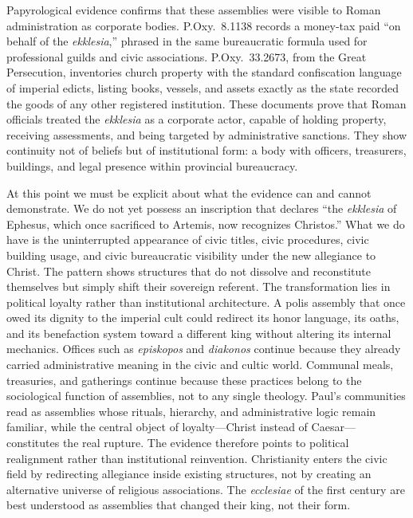 Papyrological evidence confirms that these assemblies were visible to Roman administration as corporate bodies.
P.Oxy.~8.1138 records a money-tax paid ``on behalf of the \textit{ekklesia},'' phrased in the same bureaucratic formula used for professional guilds and civic associations.
P.Oxy.~33.2673, from the Great Persecution, inventories church property with the standard confiscation language of imperial edicts, listing books, vessels, and assets exactly as the state recorded the goods of any other registered institution.
These documents prove that Roman officials treated the \textit{ekklesia} as a corporate actor, capable of holding property, receiving assessments, and being targeted by administrative sanctions.
They show continuity not of beliefs but of institutional form: a body with officers, treasurers, buildings, and legal presence within provincial bureaucracy.

At this point we must be explicit about what the evidence can and cannot demonstrate.
We do not yet possess an inscription that declares ``the \textit{ekklesia} of Ephesus, which once sacrificed to Artemis, now recognizes Christos.''
What we do have is the uninterrupted appearance of civic titles, civic procedures, civic building usage, and civic bureaucratic visibility under the new allegiance to Christ.
The pattern shows structures that do not dissolve and reconstitute themselves but simply shift their sovereign referent.
The transformation lies in political loyalty rather than institutional architecture.
A polis assembly that once owed its dignity to the imperial cult could redirect its honor language, its oaths, and its benefaction system toward a different king without altering its internal mechanics.
Offices such as \textit{episkopos} and \textit{diakonos} continue because they already carried administrative meaning in the civic and cultic world.
Communal meals, treasuries, and gatherings continue because these practices belong to the sociological function of assemblies, not to any single theology.
Paul's communities read as assemblies whose rituals, hierarchy, and administrative logic remain familiar, while the central object of loyalty---Christ instead of Caesar---constitutes the real rupture.
The evidence therefore points to political realignment rather than institutional reinvention.
Christianity enters the civic field by redirecting allegiance inside existing structures, not by creating an alternative universe of religious associations.
The \textit{ecclesiae} of the first century are best understood as assemblies that changed their king, not their form.

